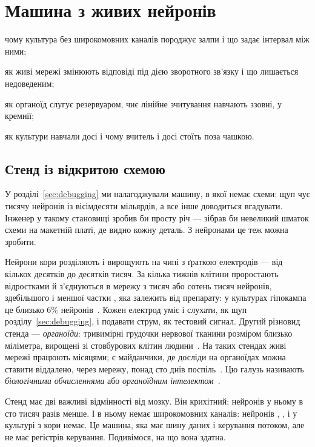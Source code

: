\chapter{Машина з живих нейронів}
\label{sec:livingmachine}
\begin{chaptergoals}
\item чому культура без широкомовних каналів породжує залпи і що задає інтервал між ними;
\item як живі мережі змінюють відповіді під дією зворотного зв'язку і що лишається недоведеним;
\item як органоїд слугує резервуаром, чиє лінійне зчитування навчають ззовні, у кремнії;
\item як культури навчали досі і чому вчитель і досі стоїть поза чашкою.
\end{chaptergoals}

\section{Стенд із відкритою схемою}

У розділі~\ref{sec:debugging} ми налагоджували машину, в якої немає схеми: щуп чує тисячу нейронів із вісімдесяти мільярдів, а все інше доводиться вгадувати. Інженер у такому становищі зробив би просту річ --- зібрав би невеликий шматок схеми на макетній платі, де видно кожну деталь. З нейронами це теж можна зробити.

Нейрони кори розділяють і вирощують на чипі з ґраткою електродів --- від кількох десятків до десятків тисяч. За кілька тижнів клітини проростають відростками й з'єднуються в мережу з тисяч або сотень тисяч нейронів, здебільшого  і меншої частки , яка залежить від препарату: у культурах гіпокампа це близько $6\%$ нейронів~\cite{Benson1994}. Кожен електрод уміє і слухати, як щуп розділу~\ref{sec:debugging}, і подавати струм, як тестовий сигнал. Другий різновид стенда --- \emph{органоїди}: тривимірні грудочки нервової тканини розміром близько міліметра, вирощені зі стовбурових клітин людини~\cite{Lancaster2013}. На таких стендах живі мережі працюють місяцями; є майданчики, де досліди на органоїдах можна ставити віддалено, через мережу, понад сто днів поспіль~\cite{Jordan2024}. Цю галузь називають \emph{біологічними обчисленнями} або \emph{органоїдним інтелектом}~\cite{Smirnova2023}.

Стенд має дві важливі відмінності від мозку. Він крихітний: нейронів у ньому в сто тисяч разів менше. І в ньому немає широкомовних каналів: нейронів , ,  і  у культурі з кори немає. Це машина, яка має шину даних і керування потоком, але не має регістрів керування. Подивімося, на що вона здатна.

